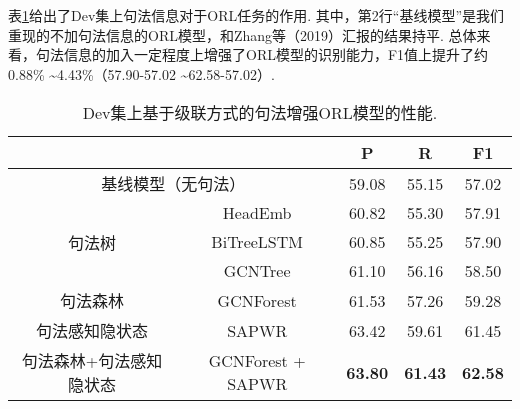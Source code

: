 表\ref{tb:orl_rst_pipeline}给出了Dev集上句法信息对于ORL任务的作用. 其中，第2行“基线模型”是我们重现的不加句法信息的ORL模型，和Zhang等（2019）汇报的结果持平. 总体来看，句法信息的加入一定程度上增强了ORL模型的识别能力，F1值上提升了约0.88\% \textasciitilde 4.43\%（57.90-57.02 \textasciitilde 62.58-57.02）.
\begin{table}[hb!]
    \centering
    \caption{Dev集上基于级联方式的句法增强ORL模型的性能. }
    \label{tb:orl_rst_pipeline}
    \begin{tabular}{cc c c c  } \toprule
                                               &                   & \textbf{P}     & \textbf{R}     & \textbf{F1 }   \\ \hline
        \multicolumn{2}{c}{基线模型（无句法）} & 59.08             & 55.15          & 57.02                           \\ \midrule
        \multirow{3}{*}{句法树}                & HeadEmb           & 60.82          & 55.30          & 57.91          \\
                                               & BiTreeLSTM        & {60.85}        & {55.25}        & {57.90}        \\
                                               & GCNTree           & 61.10          & 56.16          & 58.50          \\  \hline
        句法森林                               & GCNForest         & 61.53          & 57.26          & 59.28          \\  \midrule
        句法感知隐状态                         & SAPWR             & 63.42          & 59.61          & 61.45          \\
        \midrule
        句法森林+句法感知隐状态                & GCNForest + SAPWR & \textbf{63.80} & \textbf{61.43} & \textbf{62.58} \\
        \bottomrule


\end{tabular}
\end{table}
